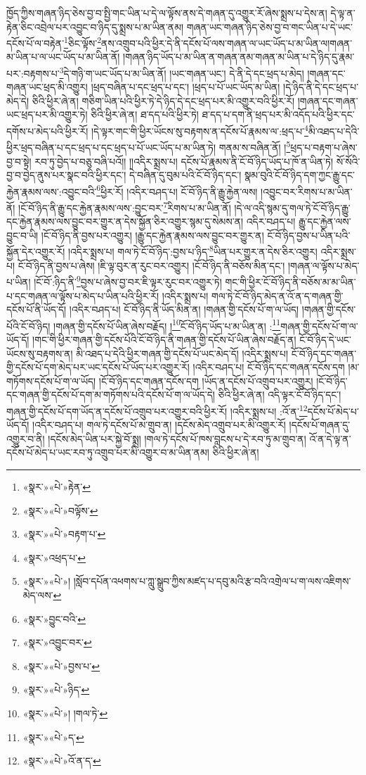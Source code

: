 ཁྱོད་ཀྱིས་གཞན་ཉིད་ཅེས་བྱ་བ་སྤྱི་གང་ཡིན་པ་དེ་ལ་ལྟོས་ནས་དེ་གཞན་དུ་འགྱུར་རོ་ཞེས་སྨྲས་པ་དེས་ན། དེ་ལྟ་ན་རྟེན་ཅིང་འབྲེལ་པར་འབྱུང་བ་ཉིད་དུ་སྨྲས་པ་མ་ཡིན་ནམ། གཞན་ཡང་གཞན་ཉིད་ཅེས་བྱ་བ་གང་ཡིན་པ་དེ་ཡང་དངོས་པོ་ལ་བརྟེན་\footnote{«སྣར་»«པེ་»རྟེན་}ཅིང་ལྟོས་\footnote{«སྣར་»«པེ་»བལྟོས་}ནས་འགྲུབ་པའི་ཕྱིར་དེ་ནི་དངོས་པོ་ལས་གཞན་ལ་ཡང་ཡོད་པ་མ་ཡིན་ལ།གཞན་མ་ཡིན་པ་ལ་ཡང་ཡོད་པ་མ་ཡིན་ནོ། །གཞན་ཉིད་ཡོད་པ་མ་ཡིན་ན་གཞན་ནམ་གཞན་མ་ཡིན་པ་དེ་ཉིད་དུ་རྣམ་པར་:བརྟགས་པ་\footnote{«སྣར་»«པེ་»བརྟག་པ་}དེ་གཉི་ག་ཡང་ཡོད་པ་མ་ཡིན་ནོ། །ཡང་གཞན་ཡང་། དེ་ནི་དེ་དང་ཕྲད་པ་མེད། །གཞན་དང་གཞན་ཡང་ཕྲད་མི་འགྱུར། །ཕྲད་བཞིན་པ་དང་ཕྲད་པ་དང་། །ཕྲད་པ་པོ་ཡང་ཡོད་མ་ཡིན། །དེ་ཉིད་ནི་དེ་དང་ཕྲད་པ་མེད་དེ། ཅིའི་ཕྱིར་ཞེ་ན། གཅིག་ཡིན་པའི་ཕྱིར་ཏེ་དེ་ཉིད་དེ་དང་ཕྲད་པར་མི་འགྱུར་བའི་ཕྱིར་རོ། །གཞན་དང་གཞན་ཡང་ཕྲད་པར་མི་འགྱུར་ཏེ། ཅིའི་ཕྱིར་ཞེ་ན། ཐ་དད་པའི་ཕྱིར་ཏེ། ཐ་དད་པ་དག་ནི་ཕྲད་པར་མི་འདོད་པའི་ཕྱིར་དང་དགོས་པ་མེད་པའི་ཕྱིར་རོ། །དེ་ལྟར་གང་གི་ཕྱིར་ཡོངས་སུ་བརྟགས་ན་དངོས་པོ་རྣམས་ལ་:ཕྲད་པ་\footnote{«སྣར་»འཕྲད་པ་}མི་འཐད་པ་དེའི་ཕྱིར་ཕྲད་བཞིན་པ་དང་ཕྲད་པ་དང་ཕྲད་པ་པོ་ཡང་ཡོད་པ་མ་ཡིན་ཏེ། གནམ་ས་བཞིན་ནོ། །\footnote{«སྣར་»«པེ་»། །སློབ་དཔོན་འཕགས་པ་ཀླུ་སྒྲུབ་ཀྱིས་མཛད་པ་དབུ་མའི་རྩ་བའི་འགྲེལ་པ་ག་ལས་འཇིགས་མེད་ལས་}ཕྲད་པ་བརྟག་པ་ཞེས་བྱ་བ་སྟེ། རབ་ཏུ་བྱེད་པ་བཅུ་བཞི་པའོ།། །།འདིར་སྨྲས་པ། དངོས་པོ་རྣམས་ནི་ངོ་བོ་ཉིད་ཡོད་པ་ཁོ་ན་ཡིན་ཏེ། སོ་སོའི་བྱ་བ་བྱེད་ནུས་པར་སྣང་བའི་ཕྱིར་དང་། དེ་བཞིན་དུ་བུམ་པའི་ངོ་བོ་ཉིད་དང་། སྣམ་བུའི་ངོ་བོ་ཉིད་དག་ཀྱང་རྒྱུ་དང་རྐྱེན་རྣམས་ལས་:འབྱུང་བའི་\footnote{«སྣར་»བྱུང་བའི་}ཕྱིར་རོ། །འདིར་བཤད་པ། ངོ་བོ་ཉིད་ནི་རྒྱུ་རྐྱེན་ལས། །འབྱུང་བར་རིགས་པ་མ་ཡིན་ནོ། །ངོ་བོ་ཉིད་ནི་རྒྱུ་དང་རྐྱེན་རྣམས་ལས་:བྱུང་བར་\footnote{«སྣར་»འབྱུང་བར་}རིགས་པ་མ་ཡིན་ནོ། །དེ་ལ་འདི་སྙམ་དུ་གལ་ཏེ་ངོ་བོ་ཉིད་རྒྱུ་དང་རྐྱེན་རྣམས་ལས་བྱུང་བར་གྱུར་ན་དེས་སྐྱོན་ཅིར་འགྱུར་སྙམ་དུ་སེམས་ན། འདིར་བཤད་པ། རྒྱུ་དང་རྐྱེན་ལས་བྱུང་བ་ཡི། །ངོ་བོ་ཉིད་ནི་བྱས་པར་འགྱུར། །རྒྱུ་དང་རྐྱེན་རྣམས་ལས་བྱུང་བར་གྱུར་ན། ངོ་བོ་ཉིད་བྱས་པ་ཡིན་པའི་སྐྱོན་དེར་འགྱུར་རོ། །འདིར་སྨྲས་པ། གལ་ཏེ་ངོ་བོ་ཉིད་:བྱས་པ་ཉིད་\footnote{«སྣར་»«པེ་»བྱས་པ་}ཡིན་པར་གྱུར་ན་དེས་ཅིར་འགྱུར། འདིར་སྨྲས་པ། ངོ་བོ་ཉིད་ནི་བྱས་པ་ཞེས། །ཇི་ལྟ་བུར་ན་རུང་བར་འགྱུར། །ངོ་བོ་ཉིད་ནི་བཅོས་མིན་དང་། །གཞན་ལ་ལྟོས་པ་མེད་པ་ཡིན། །ངོ་བོ་:ཉིད་ནི་\footnote{«སྣར་»«པེ་»ཉིད་}བྱས་པ་ཞེས་བྱ་བར་ཇི་ལྟར་རུང་བར་འགྱུར་ཏེ། གང་གི་ཕྱིར་ངོ་བོ་ཉིད་ནི་བཅོས་མ་མ་ཡིན་པ་དང་གཞན་ལ་ལྟོས་པ་མེད་པ་ཡིན་པའི་ཕྱིར་རོ། །འདིར་སྨྲས་པ། གལ་ཏེ་ངོ་བོ་ཉིད་མེད་ན་འོ་ན་ད་གཞན་གྱི་དངོས་པོ་ནི་ཡོད་དོ། །འདིར་བཤད་པ། ངོ་བོ་ཉིད་ནི་ཡོད་མིན་ན། །གཞན་གྱི་དངོས་པོ་ག་ལ་ཡོད། །གཞན་གྱི་དངོས་པོའི་ངོ་བོ་ཉིད། །གཞན་གྱི་དངོས་པོ་ཡིན་ཞེས་བརྗོད། །\footnote{«སྣར་»«པེ་»། །གལ་ཏེ་}ངོ་བོ་ཉིད་ཡོད་པ་མ་ཡིན་ན། :\footnote{«སྣར་»«པེ་»ད་}གཞན་གྱི་དངོས་པོ་ག་ལ་ཡོད་དོ། །གང་གི་ཕྱིར་གཞན་གྱི་དངོས་པོའི་ངོ་བོ་ཉིད་ནི་གཞན་གྱི་དངོས་པོ་ཡིན་ཞེས་བརྗོད་ན། ངོ་བོ་ཉིད་དེ་ཡང་ཡོངས་སུ་བརྟགས་ན། མི་འཐད་པ་དེའི་ཕྱིར་གཞན་གྱི་དངོས་པོ་ཡང་མེད་དོ། །འདིར་སྨྲས་པ། ངོ་བོ་ཉིད་དང་གཞན་གྱི་དངོས་པོ་དག་མེད་པར་ཡང་དངོས་པོ་ཡོད་པར་འགྱུར་རོ། །འདིར་བཤད་པ། ངོ་བོ་ཉིད་དང་གཞན་དངོས་དག །མ་གཏོགས་དངོས་པོ་ག་ལ་ཡོད། །ངོ་བོ་ཉིད་དང་གཞན་དངོས་དག །ཡོད་ན་དངོས་པོ་འགྲུབ་པར་འགྱུར། །ངོ་བོ་ཉིད་དང་གཞན་གྱི་དངོས་པོ་དག་མ་གཏོགས་པའི་དངོས་པོ་ག་ལ་ཡོད་དེ། ཅིའི་ཕྱིར་ཞེ་ན། འདི་ལྟར་ངོ་བོ་ཉིད་དང་། གཞན་གྱི་དངོས་པོ་དག་ཡོད་ན་དངོས་པོ་འགྲུབ་པར་འགྱུར་བའི་ཕྱིར་རོ། །འདིར་སྨྲས་པ། :འོ་ན་\footnote{«སྣར་»«པེ་»འོ་ན་ད་}དངོས་པོ་མེད་པ་ཡོད་དོ། །འདིར་བཤད་པ། གལ་ཏེ་དངོས་པོ་མ་གྲུབ་ན། །དངོས་མེད་འགྲུབ་པར་མི་འགྱུར་རོ། །དངོས་པོ་གཞན་དུ་འགྱུར་བ་ནི། །དངོས་མེད་ཡིན་པར་སྐྱེ་བོ་སྨྲ། །གལ་ཏེ་དངོས་པོ་ཁས་བླངས་པ་དེ་རབ་ཏུ་མ་གྲུབ་ན། འོ་ན་དེ་ལྟ་ན་དངོས་པོ་མེད་པ་ཡང་རབ་ཏུ་འགྲུབ་པར་མི་འགྱུར་བ་མ་ཡིན་ནམ། ཅིའི་ཕྱིར་ཞེ་ན། 